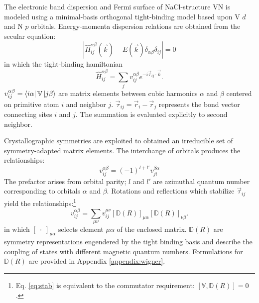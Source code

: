 \documentclass[twocolumn,showpacs,preprintnumbers,superscriptaddress,prb,floatfix,aps,10pt]{revtex4-1}
\newcommand*{\ham}{\hat{H}}
\newcommand*{\wignerD}{\mathbb{D}(R)}
\newcommand*{\bondvec}{\vec{\tau}_{ij}}
\begin{document}
The electronic band dispersion and Fermi surface of NaCl-structure VN is modeled using a minimal-basis orthogonal tight-binding model based upon V $d$ and N $p$ orbitals. Energy-momenta dispersion relations are obtained from the secular equation:
\begin{equation}
\label{eq:secular}
\left| \ham^{\alpha\beta}_{ij}(\vec{k}) - E(\vec{k})\delta_{\alpha\beta}\delta_{ij} \right| = 0
\end{equation}
in which the tight-binding hamiltonian
\begin{equation}
\label{eq:ham}
\ham^{\alpha\beta}_{ij} = \sum_j v^{\alpha\beta}_{ij} e^{-i\vec{\tau}_{ij} \cdot \vec{k} }.
\end{equation}
$v^{\alpha\beta}_{ij} = \bra{i\alpha} \mathbb{V} \ket{j\beta}$ are matrix elements between cubic harmonics $\alpha$ and $\beta$ centered on primitive atom $i$ and neighbor $j$. $\bondvec = \vec{r}_i - \vec{r}_j$ represents the bond vector connecting sites $i$ and $j$. The summation is evaluated explicitly to second neighbor. %

Crystallographic symmetries are exploited to obtained an irreducible set of symmetry-adapted matrix elements. The interchange of orbitals produces the relationships:
%
\begin{equation}
\label{eq:intrinsic}
v_{ij}^{\alpha\beta} = (-1)^{l+l'}v_{ji}^{\beta\alpha}
\end{equation}
%
The prefactor arises from orbital parity; $l$ and $l'$ are azimuthal quantum number corresponding to orbitals $\alpha$ and $\beta$. Rotations and reflections which stabilize $\bondvec$ yield the relationships:\footnote{Eq. \ref{eq:stab} is equivalent to the commutator requirement: $[\mathbb{V},\wignerD] = 0$.}
%
\begin{equation}
\label{eq:stab}
v_{ij}^{\alpha\beta} = \sum_{\mu\nu} v_{ij}^{\mu\nu} \left[\wignerD\right]_{\mu\alpha} \left[\wignerD\right]_{\nu\beta}.
\end{equation}
%
in which $\left[\phantom{.}\cdot\phantom{.}\right]_{\mu\alpha}$ selects element $\mu\alpha$ of the enclosed matrix. $\wignerD$ are symmetry representations engendered by the tight binding basis and describe the coupling of states with different magnetic quantum numbers. Formulations for $\wignerD$ are provided in Appendix \ref{appendix:wigner}.
%
\end{document}

